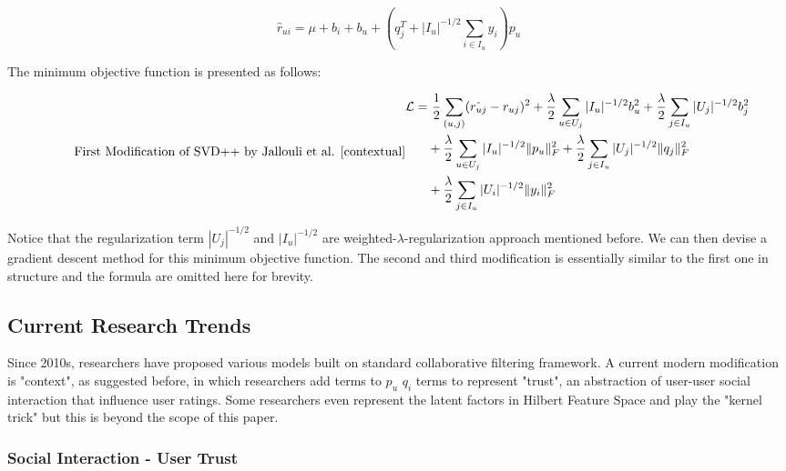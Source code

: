\documentclass[letter paper, 11pt]{article}
\begin{document}
	\begin{equation}
		\hat{r}_{ui} = \mu + b_i + b_u  + (q_j^T + |I_u|^{-1/2}\sum_{i \in I_u} y_i) p_u
	\end{equation}
	
	The minimum objective function is presented as follows:
	
	\begin{equation}
		\tag*{First Modification of SVD++ by Jallouli et al. \cite{contextual}}
		\begin{split}
			\mathcal{L} = &\ \dfrac{1}{2} \sum_{(u, j)} (\hat{r_{uj}} - r_{uj})^2 + \dfrac{\lambda}{2} \sum_{u \in U_j} |I_u|^{-1/2} b_u^2 + \dfrac{\lambda}{2} \sum_{j \in I_u} |U_j|^{-1/2} b_j^2 \\
			& + \dfrac{\lambda}{2} \sum_{u \in U_j} |I_u|^{-1/2} \|p_u\|_F^{2} + \dfrac{\lambda}{2} \sum_{j \in I_u} |U_j|^{-1/2} \|q_j\|_F^{2} \\
			& + \dfrac{\lambda}{2} \sum_{j \in I_u} |U_i|^{-1/2} \|y_i\|_F^{2}
		\end{split}
	\end{equation}
	
	Notice that the regularization term $|U_j|^{-1/2}$ and $|I_u|^{-1/2}$ are weighted-$\lambda$-regularization approach mentioned before. We can then devise a gradient descent method for this minimum objective function. The second and third modification is essentially similar to the first one in structure and the formula are omitted here for brevity.
	
	
	\subsection{Current Research Trends}
	Since 2010s, researchers have proposed various models built on standard collaborative filtering framework. A current modern modification is "context", as suggested before, in which researchers add terms to $p_u$ $q_i$ terms to represent "trust", an abstraction of user-user social interaction that influence user ratings. Some researchers even represent the latent factors in Hilbert Feature Space and play the "kernel trick" \cite{Kernel-MF} but this is beyond the scope of this paper.
	
	\subsubsection{Social Interaction - User Trust}
	
\end{document}
